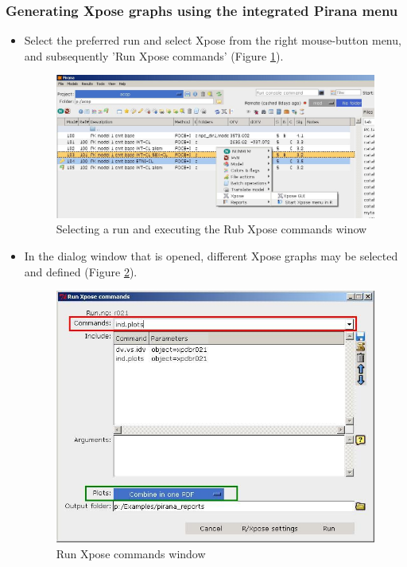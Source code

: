 \subsubsection*{Generating Xpose graphs using the integrated Pirana menu}
\begin{itemize}
\item Select the preferred run and select Xpose from the right
  mouse-button menu, and subsequently 'Run Xpose commands' (Figure
  \ref{fig:Fig1}).
\begin{figure}[h] \centering
    \includegraphics[scale=.32]{images/xpose_1.JPG}
    \caption{Selecting a run and executing the Rub Xpose commands winow\label{fig:Fig1}}
\end{figure}
\item In the dialog window that is opened, different Xpose graphs may
  be selected and defined (Figure \ref{fig:Fig2}).
\begin{figure}[h] \centering
    \includegraphics[scale=.45]{images/xpose_2.jpg}
    \caption{Run Xpose commands window\label{fig:Fig2}}

\end{figure}
\end{itemize}
